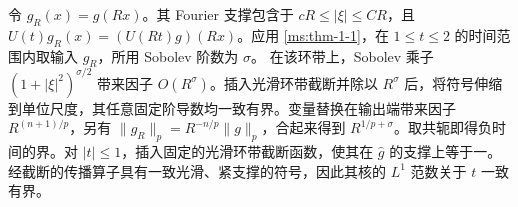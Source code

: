 令 $g_R(x)=g(Rx)$。其 Fourier 支撑包含于 $cR\le|\xi|\le CR$，且 $U(t)g_R(x)=(U(Rt)g)(Rx)$。应用 \ref{ms:thm-1-1}，在 $1\le t\le2$ 的时间范围内取输入 $g_R$，所用 Sobolev 阶数为 $\sigma$。
在该环带上，Sobolev 乘子 $(1+|\xi|^2)^{\sigma/2}$ 带来因子 $O(R^\sigma)$。插入光滑环带截断并除以 $R^\sigma$ 后，将符号伸缩到单位尺度，其任意固定阶导数均一致有界。变量替换在输出端带来因子 $R^{(n+1)/p}$，另有 $\|g_R\|_p=R^{-n/p}\|g\|_p$，合起来得到 $R^{1/p+\sigma}$。取共轭即得负时间的界。对 $|t|\le1$，插入固定的光滑环带截断函数，使其在 $\widehat g$ 的支撑上等于一。经截断的传播算子具有一致光滑、紧支撑的符号，因此其核的 $L^1$ 范数关于 $t$ 一致有界。
